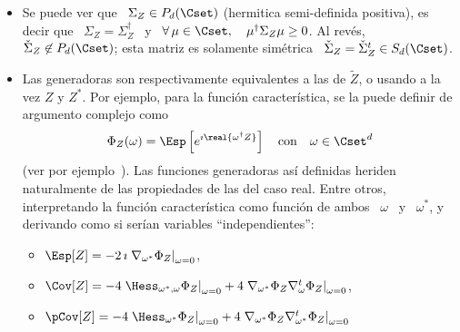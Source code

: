 \begin{itemize}
\begin{itemize}
\[    \]
    conteniendo todas las convarianzas, y por el otro lado,
    \[
    \Sigma_Z =  \left( \Sigma_X  + \Sigma_Y \right)  - \imath \left(  \Sigma_{X,Y} -
      \Sigma_{X,Y}^t \right)
    \]
Se puede ver que la covarianza de $Z$ no contiene todos
    los  terminos   de  orden   2.  Por  eso,   se  define  tambi\'en   la  {\em
      pseudo-covarianza}, sin terminos conjugados,
    \[
    \check{\Sigma}_Z \equiv \pCov[Z] \equiv \Esp\left[ (Z-m_Z) (Z-m_Z)^t \right]
    \]
    Ahora, se puede ver que
    \[
    \check{\Sigma}_Z =  \left( \Sigma_X  - \Sigma_Y \right)  + \imath \left(  \Sigma_{X,Y} + 
      \Sigma_{X,Y}^t \right)
    \]
    Entonces,  se  recupera  inmediatamente   $\Sigma_X,  \:  \Sigma_Y$  \  y  \
    $\Sigma_{X,Y}$  \  a  partir  de  \ $\Sigma_Z$  \  y  \  $\check{\Sigma}_Z$;
    Claramente,   los   momentos   centrales   de   orden  2   son   dados   por
    \underline{ambas} \ $\Sigma_Z$ \ y \ $\check{\Sigma}_Z$.
  \end{itemize}
  Los momentos  as\'i definidos heriden  naturalmente de las propiedades  de las
  del caso real.
%
\item  Se puede  ver que  \ $\Sigma_Z  \in P_d(\Cset)$  (hermitica semi-definida
  positiva), es decir que \ $\Sigma_Z = \Sigma_Z^\dag$ \ y \ $\forall \, \mu \in
  \Cset,  \quad \mu^\dag  \Sigma_Z \mu  \ge 0$.   Al  rev\'es, $\check{\Sigma}_Z
  \not\in P_d(\Cset)$; esta matriz  es solamente sim\'etrica \ $\check{\Sigma}_Z
  = \check{\Sigma}_Z^t \in S_d(\Cset)$.
%
\item Las generadoras son respectivamente equivalentes a las de $\widetilde{Z}$,
  o  usando   a  la  vez   $Z$  y  $Z^*$.    Por  ejemplo,  para   la  funci\'on
  caracter\'istica, se la puede definir de argumento complejo como
  \[
  \Phi_Z(\omega)  =  \Esp\left[ e^{\imath  \real{\omega^\dag  Z}} \right]  \quad
  \mbox{con} \quad \omega \in \Cset^d
  \]
  (ver  por  ejemplo~\cite[Cap.~17]{Lap17}).   Las funciones  generadoras  as\'i
  definidas heriden naturalmente de las  propiedades de las del caso real. Entre
  otros, interpretando  la funci\'on caracter\'istica como funci\'on  de ambos \
  $\omega$ \ y \ $\omega^*$, y derivando como si ser\'ian variables ``independientes'':
  \begin{itemize}
  \item $\Esp[Z]  = - 2 \, \imath  \left. \nabla_{\omega^*} \Phi_Z  \right|_{\omega =
      0}$,
  \item $\Cov[Z] = - 4 \left. \Hess_{\omega^*,\omega} \Phi_Z \right|_{\omega = 0} +
    4 \left. \nabla_{\omega^*}  \Phi_Z \nabla_{\omega}^t \Phi_Z  \right|_{\omega =
      0}$,
  \item  $\pCov[Z] =  - 4 \left.  \Hess_{\omega^*}  \Phi_Z \right|_{\omega  = 0}  +
    4 \left. \nabla_{\omega^*} \Phi_Z \nabla_{\omega^*}^t \Phi_Z \right|_{\omega =
      0}$
  \end{itemize}
\end{itemize}

